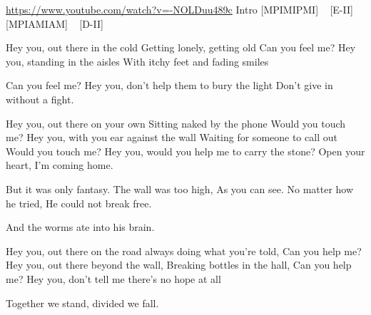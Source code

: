 \url{https://www.youtube.com/watch?v=-NOLDuu489c}
Intro
[MPIMIPMI] ~ [E-II] ~ [MPIAMIAM] ~ [D-II]


Hey you, out there in the cold
Getting lonely, getting old
Can you feel me?
Hey you, standing in the aisles
With itchy feet and fading smiles

Can you feel me?
Hey you, don’t help them to bury the light
Don't give in without a fight.

Hey you, out there on your own
Sitting naked by the phone
Would you touch me?
Hey you, with you ear against the wall
Waiting for someone to call out
Would you touch me?
Hey you, would you help me to carry the stone?
Open your heart, I'm coming home.

But it was only fantasy.
The wall was too high,
As you can see.
No matter how he tried,
He could not break free.

And the worms ate into his brain.

Hey you, out there on the road
always doing what you're told,
Can you help me?
Hey you, out there beyond the wall,
Breaking bottles in the hall,
Can you help me?
Hey you, don't tell me there's no hope at all

Together we stand, divided we fall.
